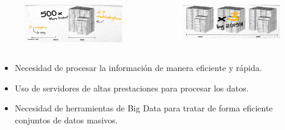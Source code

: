 {
		
	\begin{frame}{}
	\begin{columns}[c]
		\begin{figure}[H]
			\centering
			\includegraphics[width=5cm]{./Images/data2.png}
		\end{figure}
					
		
		\begin{figure}[H]
			\centering
			\includegraphics[width=5cm]{./Images/data3.png}
		\end{figure}
	\end{columns}

		
		\begin{itemize}
			\item Necesidad de procesar la información de manera eficiente y rápida.
			\item Uso de servidores de altas prestaciones para procesar los datos.
			\item Necesidad de herramientas de Big Data para tratar de forma eficiente conjuntos de datos masivos.
		\end{itemize}
	\end{frame}
}